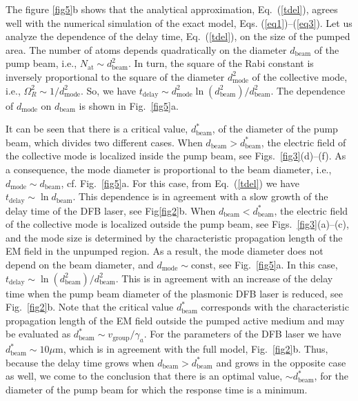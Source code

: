 \documentclass[aps,pra,amsmath,amssymb,onecolumn,superscriptaddress,showpacs,floatfix,]{revtex4-1}
\begin{document}
The figure \ref{fig5}b shows that the analytical approximation, Eq.~(\ref{tdel}), agrees well with the numerical simulation of the exact model, Eqs. (\ref{eq1})--(\ref{eq3}).
Let us analyze the dependence of the delay time, Eq.~(\ref{tdel}), on the size of the pumped area.
The number of atoms depends quadratically on the diameter $d_{\text{beam}}$ of the pump beam, i.e., $N_{\text{at}} \sim d_{\text{beam}}^2$.
In turn, the square of the Rabi constant is inversely proportional to the square of the diameter $d_{\text{mode}}^2$ of the collective mode, i.e., $\Omega_{R}^{2} \sim 1/d_{\text{mode}}^2$.
So, we have $t_{\text{delay}} \sim d_{\text{mode}}^2\ln \left( d_{\text{beam}}^2 \right ) /d_{\text{beam}}^2$.
The dependence of $d_{\text{mode}}$ on $d_{\text{beam}}$ is shown in Fig.~\ref{fig5}a.

It can be seen that there is a critical value, $d_{\text{beam}}^*$, of the diameter of the pump beam, which divides two different cases.
When $d_{\text{beam}}>d_{\text{beam}}^*$, the electric field of the collective mode is localized inside the pump beam, see Figs.~\ref{fig3}(d)--(f).
As a consequence, the mode diameter is proportional to the beam diameter, i.e., $d_{\text{mode}} \sim d_{\text{beam}}$, cf. Fig.~\ref{fig5}a.
For this case, from Eq.~(\ref{tdel}) we have $t_{\text{delay}} \sim \ln d_{\text{beam}}$.
This dependence is in agreement with a slow growth of the delay time of the DFB laser, see Fig\ref{fig2}b.
When $d_{\text{beam}}<d_{\text{beam}}^*$, the electric field of the collective mode is localized outside the pump beam, see Figs.~\ref{fig3}(a)--(c), and the mode size is determined by the characteristic propagation length of the EM field in the unpumped region.
As a result, the mode diameter does not depend on the beam diameter, and $d_{\text{mode}} \sim \text{const}$, see Fig.~\ref{fig5}a.
In this case, $t_{\text{delay}} \sim \ln(d_{\text{beam}}^2)/d_{\text{beam}}^2$.
This is in agreement with an increase of the delay time  when the pump beam diameter of the plasmonic DFB laser is reduced, see Fig.~\ref{fig2}b.
Note that the critical value $d_{\text{beam}}^*$ corresponds with the characteristic propagation length of the EM field outside the pumped active medium and may be evaluated as $d_{\text{beam}}^* \sim v_{\text{group}}/\gamma_a$.
For the parameters of the DFB laser we have $d_{\text{beam}}^* \sim 10 \mu \text{m}$, which is in agreement with the full model, Fig.~\ref{fig2}b.
Thus, because the delay time grows when $d_{\text{beam}}>d_{\text{beam}}^*$ and grows in the opposite case as well, we come to the conclusion that there is an optimal value, $\sim d_{\text{beam}}^*$, for the diameter of the pump beam for which the response time is a minimum.
\end{document}
